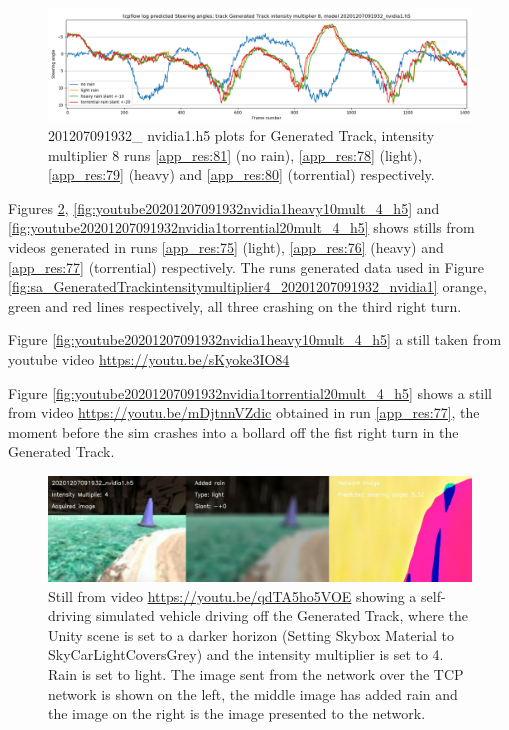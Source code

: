 \begin{figure}[h!]
 \centering 
 \includegraphics[width=\textwidth]{Figures/sa_GeneratedTrackintensitymultiplier8_20201207091932_nvidia1.h5.png}
 \caption{201207091932\_ nvidia1.h5 plots for Generated Track, intensity multiplier 8 runs \ref{app_res:81} (no rain),  \ref{app_res:78} (light), \ref{app_res:79} (heavy) and \ref{app_res:80} (torrential) respectively.}
 \label{fig:sa_GeneratedTrackintensitymultiplier8_20201207091932_nvidia1} 
\end{figure}


Figures \ref{fig:youtube20201207091932nvidia1lightrainmult_4_h5}, \ref{fig:youtube20201207091932nvidia1heavy10mult_4_h5} and  \ref{fig:youtube20201207091932nvidia1torrential20mult_4_h5} shows stills from videos generated in runs \ref{app_res:75} (light), \ref{app_res:76} (heavy) and \ref{app_res:77} (torrential) respectively. The runs generated data used in Figure \ref{fig:sa_GeneratedTrackintensitymultiplier4_20201207091932_nvidia1} orange, green and red lines respectively, all three crashing on the third right turn.

Figure \ref{fig:youtube20201207091932nvidia1heavy10mult_4_h5} a still taken from youtube video \url{https://youtu.be/sKyoke3IO84}

Figure  \ref{fig:youtube20201207091932nvidia1torrential20mult_4_h5} shows a still from video \url{https://youtu.be/mDjtnnVZdic} obtained in run \ref{app_res:77}, the moment before the sim crashes into a bollard off the fist right turn in the Generated Track.

\begin{figure}[h!]
 \centering 
 \includegraphics[width=\textwidth]{Figures/youtube20201207091932nvidia1lightrainmult_4_h5.png}
 \caption{Still from video \url{https://youtu.be/qdTA5ho5VOE} showing a self-driving simulated vehicle driving off the Generated Track, where the Unity scene is set to a darker horizon (Setting Skybox Material to SkyCarLightCoversGrey) and the intensity multiplier is set to 4. Rain is set to light. The image sent from the network over the TCP network is shown on the left, the middle image has added rain and the image on the right is the image presented to the network.}
 \label{fig:youtube20201207091932nvidia1lightrainmult_4_h5} 
\end{figure}

